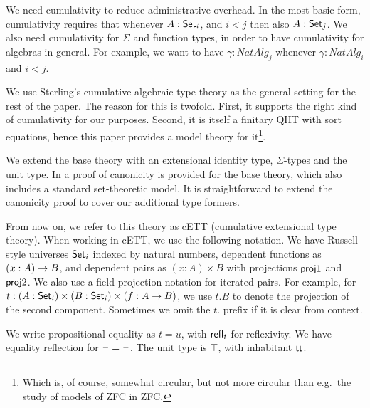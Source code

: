 \documentclass{llncs}
\begin{document}

We need cumulativity to reduce administrative overhead. In the most basic form,
cumulativity requires that whenever $A : \Set_i$, and $i < j$ then also $A :
\Set_j$. We also need cumulativity for $\Sigma$ and function types, in order to
have cumulativity for algebras in general. For example, we want to have $\gamma
: NatAlg_j$ whenever $\gamma : NatAlg_i$ and $i < j$.


We use Sterling's cumulative algebraic type theory \cite{TODO} as the general
setting for the rest of the paper. The reason for this is twofold. First, it
supports the right kind of cumulativity for our purposes. Second, it is itself a
finitary QIIT with sort equations, hence this paper provides a model theory for
it\footnote{Which is, of course, somewhat circular, but not more circular than
  e.g.\ the study of models of ZFC in ZFC.}.

We extend the base theory with an extensional identity type, $\Sigma$-types and
the unit type. In \cite{TODO} a proof of canonicity is provided for the base
theory, which also includes a standard set-theoretic model. It is
straightforward to extend the canonicity proof to cover our additional type
formers.

From now on, we refer to this theory as cETT (cumulative extensional type
theory). When working in cETT, we use the following notation. We
have Russell-style universes $\Set_i$ indexed by natural numbers, dependent
functions as $(x : A)\ra B$, and dependent pairs as $(x : A)\times B$ with
projections $\proj1$ and $\proj2$. We also use a field projection notation
for iterated pairs. For example, for $t : (A : \Set_i) \times (B : \Set_i)
\times (f : A \ra B)$, we use $t.B$ to denote the projection of the second
component. Sometimes we omit the $t.$ prefix if it is clear from context.

We write propositional equality as $t = u$, with $\refl_t$ for reflexivity. We
have equality reflection for $\blank=\blank$. The unit type is $\top$, with
inhabitant $\tt$.
\end{document}
